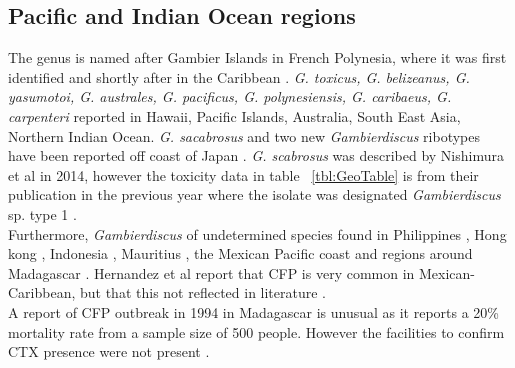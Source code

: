 \documentclass[12pt]{article}
\begin{document}
\subsection{Pacific and Indian Ocean regions}
The genus is named after Gambier Islands in French Polynesia, where it was first identified \cite{adachi1979thecal} and shortly after in the Caribbean \cite{besada1982observations}.
\emph{G. toxicus, G. belizeanus, G. yasumotoi, G. australes, G. pacificus, G. polynesiensis, G. caribaeus, G. carpenteri} reported in Hawaii, Pacific Islands, Australia, South East Asia, Northern Indian Ocean.
\emph{G. sacabrosus} and two new \emph{Gambierdiscus} ribotypes have been reported off coast of Japan \cite{nishimura2013genetic,nishimura2014morphology}. \emph{G. scabrosus} was described by Nishimura et al in 2014, however the toxicity data in table ~\ref{tbl:GeoTable} is from their publication in the previous year where the isolate was designated \emph{Gambierdiscus} sp. type 1 \cite{nishimura2013genetic,nishimura2014morphology}. \\
Furthermore, \emph{Gambierdiscus} of undetermined species found in Philippines \cite{gillespie1987possible}, Hong kong \cite{lu2004harmful}, Indonesia \cite{praseno1996hab}, Mauritius \cite{hurbungs2002seasonal}, the Mexican Pacific coast \cite{ceballos2006analisis} and regions around Madagascar \cite{grzebyk1994ecology}. Hernandez et al report that CFP is very common in Mexican-Caribbean, but that this not reflected in literature \cite{hernandez2004species}.\\
A report of CFP outbreak in 1994 in Madagascar is unusual as it reports a 20\% mortality rate from a sample size of 500 people. However the facilities to confirm CTX presence were not present \cite{habermehl1994severe}. 
\end{document}
